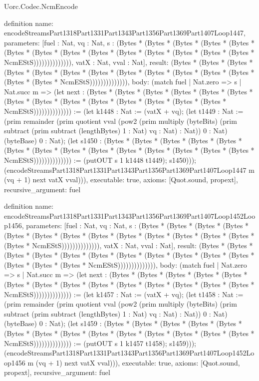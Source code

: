 \begin{lexlean}{Uorc.Codec.NcmEncode}
\begin{semanticmodule}
definition{
  name: encodeStreamsPart1318Part1331Part1343Part1356Part1369Part1407Loop1447,
  parameters: [fuel : Nat, vq : Nat, s : (Bytes * (Bytes * (Bytes * (Bytes * (Bytes * (Bytes * (Bytes * (Bytes * (Bytes * (Bytes * (Bytes * (Bytes * (Bytes * (Bytes * NcmEStS)))))))))))))), vatX : Nat, vval : Nat],
  result: (Bytes * (Bytes * (Bytes * (Bytes * (Bytes * (Bytes * (Bytes * (Bytes * (Bytes * (Bytes * (Bytes * (Bytes * (Bytes * (Bytes * NcmEStS)))))))))))))),
  body: (match fuel
    | Nat.zero => s
    | Nat.succ m => (let next : (Bytes * (Bytes * (Bytes * (Bytes * (Bytes * (Bytes * (Bytes * (Bytes * (Bytes * (Bytes * (Bytes * (Bytes * (Bytes * (Bytes * NcmEStS)))))))))))))) := (let k1448 : Nat := (vatX + vq); (let t1449 : Nat := (prim remainder (prim quotient vval (pow2 (prim multiply (byteBits) (prim subtract (prim subtract (lengthBytes) 1 : Nat) vq : Nat) : Nat)) 0 : Nat) (byteBase) 0 : Nat); (let s1450 : (Bytes * (Bytes * (Bytes * (Bytes * (Bytes * (Bytes * (Bytes * (Bytes * (Bytes * (Bytes * (Bytes * (Bytes * (Bytes * (Bytes * NcmEStS)))))))))))))) := (putOUT s 1 k1448 t1449); s1450))); (encodeStreamsPart1318Part1331Part1343Part1356Part1369Part1407Loop1447 m (vq + 1) next vatX vval))),
  executable: true,
  axioms: [Quot.sound, propext],
  recursive_argument: fuel
}

definition{
  name: encodeStreamsPart1318Part1331Part1343Part1356Part1369Part1407Loop1452Loop1456,
  parameters: [fuel : Nat, vq : Nat, s : (Bytes * (Bytes * (Bytes * (Bytes * (Bytes * (Bytes * (Bytes * (Bytes * (Bytes * (Bytes * (Bytes * (Bytes * (Bytes * (Bytes * NcmEStS)))))))))))))), vatX : Nat, vval : Nat],
  result: (Bytes * (Bytes * (Bytes * (Bytes * (Bytes * (Bytes * (Bytes * (Bytes * (Bytes * (Bytes * (Bytes * (Bytes * (Bytes * (Bytes * NcmEStS)))))))))))))),
  body: (match fuel
    | Nat.zero => s
    | Nat.succ m => (let next : (Bytes * (Bytes * (Bytes * (Bytes * (Bytes * (Bytes * (Bytes * (Bytes * (Bytes * (Bytes * (Bytes * (Bytes * (Bytes * (Bytes * NcmEStS)))))))))))))) := (let k1457 : Nat := (vatX + vq); (let t1458 : Nat := (prim remainder (prim quotient vval (pow2 (prim multiply (byteBits) (prim subtract (prim subtract (lengthBytes) 1 : Nat) vq : Nat) : Nat)) 0 : Nat) (byteBase) 0 : Nat); (let s1459 : (Bytes * (Bytes * (Bytes * (Bytes * (Bytes * (Bytes * (Bytes * (Bytes * (Bytes * (Bytes * (Bytes * (Bytes * (Bytes * (Bytes * NcmEStS)))))))))))))) := (putOUT s 1 k1457 t1458); s1459))); (encodeStreamsPart1318Part1331Part1343Part1356Part1369Part1407Loop1452Loop1456 m (vq + 1) next vatX vval))),
  executable: true,
  axioms: [Quot.sound, propext],
  recursive_argument: fuel
}


\end{semanticmodule}
\end{lexlean}
